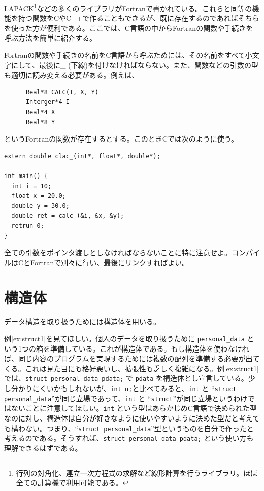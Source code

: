 LAPACK\footnote{行列の対角化、連立一次方程式の求解など線形計算を行うライブラリ。ほぼ全ての計算機で利用可能である。}などの多くのライブラリがFortranで書かれている。これらと同等の機能を持つ関数をCやC++で作ることもできるが、既に存在するのであればそちらを使った方が便利である。ここでは、C言語の中からFortranの関数や手続きを呼ぶ方法を簡単に紹介する。

Fortranの関数や手続きの名前をC言語から呼ぶためには、その名前をすべて小文字にして、最後に\_ (下線)を付けなければならない。また、関数などの引数の型も適切に読み変える必要がある。例えば、
\begin{reidai}
\begin{verbatim}
      Real*8 CALC(I, X, Y)
      Interger*4 I
      Real*4 X
      Real*8 Y
\end{verbatim}
\end{reidai} \noindent
というFortranの関数が存在するとする。このときCでは次のように使う。
\begin{reidai}
\begin{verbatim}
extern double clac_(int*, float*, double*);

int main() {
  int i = 10;
  float x = 20.0;
  double y = 30.0;
  double ret = calc_(&i, &x, &y);
  retrun 0;
}
\end{verbatim}
\end{reidai} \noindent
全ての引数をポインタ渡しとしなければならないことに特に注意せよ。コンパイルはCとFortranで別々に行い、最後にリンクすればよい。

\section{構造体}
データ構造を取り扱うためには構造体を用いる。

例\ref{ex:struct1}を見てほしい。個人のデータを取り扱うために \verb|personal_data| という1つの箱を準備している。これが構造体である。もし構造体を使わなければ、同じ内容のプログラムを実現するためには複数の配列を準備する必要が出てくる。これは見た目にも格好悪いし、拡張性も乏しく複雑になる。例\ref{ex:struct1}では、\verb|struct personal_data pdata;| で \verb|pdata| を構造体とし宣言している。少し分かりにくいかもしれないが、\verb|int n;|と比べてみると、\verb|int| と ``\verb|struct personal_data|''が同じ立場であって、\verb|int| と ``\verb|struct|''が同じ立場というわけではないことに注意してほしい。\verb|int| という型はあらかじめC言語で決められた型なのに対し、構造体は自分が好きなように使いやすいように決めた型だと考えても構わない。つまり、``\verb|struct personal_data|''型というものを自分で作ったと考えるのである。そうすれば、\verb|struct personal_data pdata;| という使い方も理解できるはずである。

